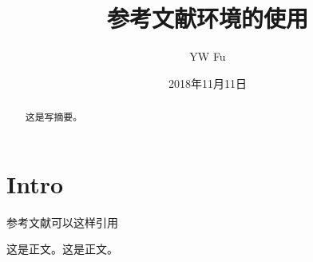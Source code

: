\documentclass{ctexart}
\title{参考文献环境的使用}
\author{YW Fu}
\date{2018年11月11日}
\begin{document}
	\maketitle 
	\begin{abstract}	%
		这是写摘要。
	\end{abstract}	
	\section{Intro}
	参考文献可以这样引用
	
	
	这是正文。这是正文\cite{.}\cite{Das.2018}。
	
	\newpage
	
	
	

			
		 
\end{document}
